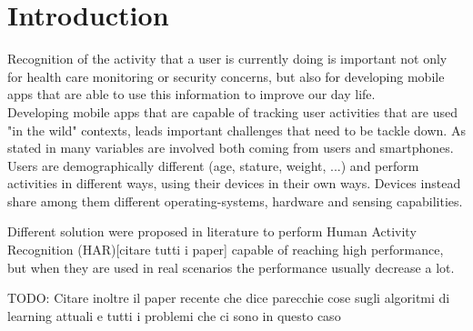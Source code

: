 
\section{Introduction}
\label{sec:introduction}
Recognition of the activity that a user is currently doing is important not only for health care monitoring or security concerns, but also for developing mobile apps that are able to use this information to improve our day life. \\

Developing mobile apps that are capable of tracking user activities that are used "in the wild" contexts, leads important challenges that need to be tackle down. As stated in \cite{blunck2013heterogeneity} many variables are involved both coming from users and smartphones. Users are demographically different (age, stature, weight, ...) and perform activities in different ways, using their devices in their own ways. Devices instead share among them different operating-systems, hardware and sensing capabilities.

Different solution were proposed in literature to perform Human Activity Recognition (HAR)[citare tutti i paper] capable of reaching high performance, but when they are used in real scenarios the performance usually decrease a lot.

TODO: Citare inoltre il paper \cite{chen2020deep} recente che dice parecchie cose sugli algoritmi di learning attuali e tutti i problemi che ci sono in questo caso 




